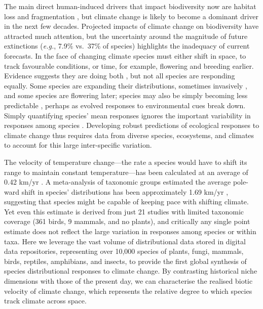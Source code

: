 \documentclass[12pt]{report}
\begin{document}
The main direct human-induced drivers that impact biodiversity now are
habitat loss \supercite{Newbold2015} and fragmentation
\supercite{Haddad2015}, but climate change is likely to become a
dominant driver in the next few
decades\supercite{Parmesan2003,Thuiller2007,Urban2015}. Projected
impacts of climate change on biodiversity have attracted much
attention, but the uncertainty around the magnitude of future
extinctions (\emph{e.g.}, 7.9\%\supercite{Urban2015} vs.\
37\%\supercite{Thomas2004} of species) highlights the inadequacy of
current forecasts.  In the face of changing climate species must
either shift in space, to track favourable conditions, or time, for
example, flowering and breeding earlier.
Evidence suggests they are doing both
\supercite{Parmesan2003,Parmesan2006,Menzel2006,Chen2011}, but not all
species are responding equally. Some species are expanding their
distributions, sometimes invasively \supercite{Hellmann2008}, and some
species are flowering later\supercite{Cook2012}; species may also be
simply becoming less predictable \supercite{Pearse2017phenology},
perhaps as evolved responses to environmental cues break down.  Simply
quantifying species' mean responses ignores the important variability
in responses among species \supercite{Wolkovich2012}. Developing
robust predictions of ecological responses to climate change thus
requires data from diverse species, ecosystems, and climates to
account for this large inter-specific variation.

The velocity of temperature change---the rate a species would have to
shift its range to maintain constant temperature---has been calculated
at an average of 0.42 km/yr \supercite{Loarie2009}. A meta-analysis of
taxonomic groups estimated the average pole-ward shift in species'
distributions has been approximately 1.69 km/yr \supercite{Chen2011},
suggesting that species might be capable of keeping pace with shifting
climate. Yet even this estimate is derived from just 21 studies with
limited taxonomic coverage (361 birds, 9 mammals, and no plants), and
critically any single point estimate does not reflect the large
variation in responses among species or within taxa. Here we leverage
the vast volume of distributional data stored in digital data
repositories\supercite{url_gbif}, representing over 10,000 species of
plants, fungi, mammals, birds, reptiles, amphibians, and insects, to
provide the first global synthesis of species distributional responses
to climate change. By contrasting historical niche dimensions with
those of the present day, we can characterise the realised biotic
velocity of climate change, which represents the relative degree to
which species track climate across space.
\end{document}
